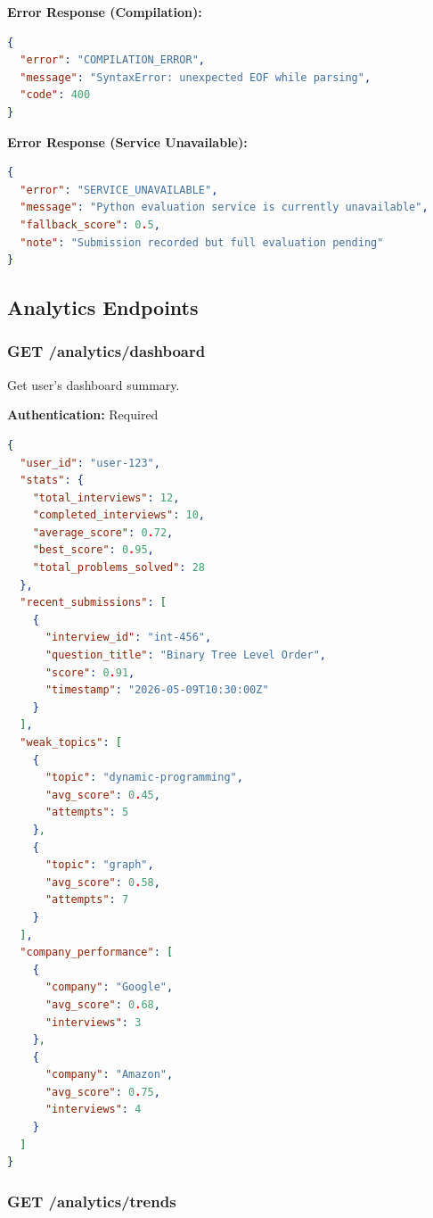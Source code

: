 \documentclass[12pt,a4paper,oneside]{article}
\begin{document}
\textbf{Error Response (Compilation):}

\begin{lstlisting}[language=JSON, caption=Response 400 with Error]
{
  "error": "COMPILATION_ERROR",
  "message": "SyntaxError: unexpected EOF while parsing",
  "code": 400
}
\end{lstlisting}

\textbf{Error Response (Service Unavailable):}

\begin{lstlisting}[language=JSON, caption=Response 503]
{
  "error": "SERVICE_UNAVAILABLE",
  "message": "Python evaluation service is currently unavailable",
  "fallback_score": 0.5,
  "note": "Submission recorded but full evaluation pending"
}
\end{lstlisting}

\subsection{Analytics Endpoints}

\subsubsection{GET /analytics/dashboard}

Get user's dashboard summary.

\textbf{Authentication:} Required

\begin{lstlisting}[language=JSON, caption=Response 200]
{
  "user_id": "user-123",
  "stats": {
    "total_interviews": 12,
    "completed_interviews": 10,
    "average_score": 0.72,
    "best_score": 0.95,
    "total_problems_solved": 28
  },
  "recent_submissions": [
    {
      "interview_id": "int-456",
      "question_title": "Binary Tree Level Order",
      "score": 0.91,
      "timestamp": "2026-05-09T10:30:00Z"
    }
  ],
  "weak_topics": [
    {
      "topic": "dynamic-programming",
      "avg_score": 0.45,
      "attempts": 5
    },
    {
      "topic": "graph",
      "avg_score": 0.58,
      "attempts": 7
    }
  ],
  "company_performance": [
    {
      "company": "Google",
      "avg_score": 0.68,
      "interviews": 3
    },
    {
      "company": "Amazon",
      "avg_score": 0.75,
      "interviews": 4
    }
  ]
}
\end{lstlisting}

\subsubsection{GET /analytics/trends}
\end{document}
